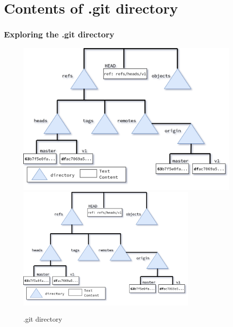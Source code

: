\section{Contents of .git directory}
\begin{frame}[fragile]
    \frametitle{Exploring the .git directory}
    \begin{figure}
        \begin{center}
            {
                \includegraphics[height=0.75\textheight,keepaspectratio]{./images/gitDirectory.png}
            }
            {
                \includegraphics[height=0.75\textheight,width=0.8\textwidth]{./images/gitDirectory.png}
            }
            \caption{.git directory}
        \end{center}
    \end{figure}
\end{frame}

